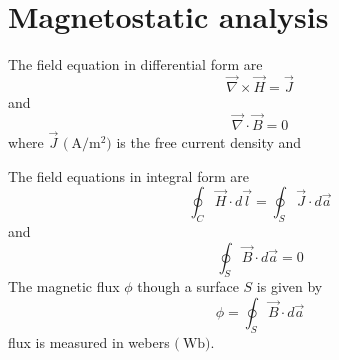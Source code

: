 \documentclass[11pt,a4paper,oneside]{book}
\numberwithin{equation}{section}
\theoremstyle{it}
\theoremstyle{definition}
\begin{document}
\section{Magnetostatic analysis}
The field equation in differential form are
\begin{equation}\label{eq1}
	\vec{\nabla}\times\vec{H}=\vec{J}
\end{equation}
and
\begin{equation}\label{eq2}
	\vec{\nabla}\cdot\vec{B}=0
\end{equation}
where $\vec{J}$ $\big(\SI{}{\ampere\per\square\meter}\big)$ is the free current density and 
\begin{center}
\end{center}
The field equations in integral form are
\begin{equation}\label{eq3}
	\oint_{C}\vec{H}\cdot d\vec{l}=\oint_{S}\vec{J}\cdot d\vec{a}
\end{equation}
and
\begin{equation}\label{eq4}
	\oint_{S}\vec{B}\cdot d\vec{a}= 0
\end{equation}
The magnetic flux $\phi$ though a surface $S$ is given by
\begin{equation}\label{eq5}
	\phi = \oint_{S}\vec{B}\cdot d\vec{a}
\end{equation}
flux is measured in webers $\big(\SI{}{\weber}\big)$.
\end{document}
